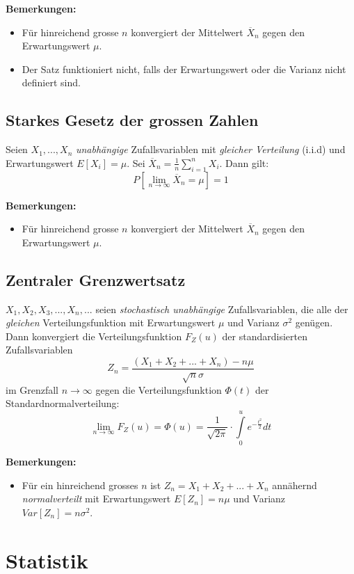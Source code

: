 \documentclass[10pt,a4paper,twocolumn]{article}
\begin{document}
\textbf{Bemerkungen:}
\begin{itemize}
\item Für hinreichend grosse $n$ konvergiert der Mittelwert $\overline{X}_n$ gegen den Erwartungswert $\mu$.
\item Der Satz funktioniert nicht, falls der Erwartungswert oder die Varianz nicht definiert sind.
\end{itemize}

\subsection{Starkes Gesetz der grossen Zahlen}
Seien $X_1,...,X_n$ \emph{unabhängige} Zufallsvariablen mit \emph{gleicher Verteilung} (i.i.d) und Erwartungswert $E[X_i]=\mu$. Sei $\overline{X}_n=\frac{1}{n}\sum\nolimits_{i=1}^{n}X_i$. Dann gilt:
\[
P\left[\lim_{n\to\infty}\overline{X}_n=\mu\right]=1
\]

\textbf{Bemerkungen:}
\begin{itemize}
\item Für hinreichend grosse $n$ konvergiert der Mittelwert $\overline{X}_n$ gegen den Erwartungswert $\mu$.
\end{itemize}

\subsection{Zentraler Grenzwertsatz}
$X_1,X_2,X_3,...,X_n,...$ seien \emph{stochastisch unabhängige} Zufallsvariablen, die alle der \emph{gleichen} Verteilungsfunktion mit Erwartungswert $\mu$ und Varianz $\sigma^2$ genügen. Dann konvergiert die Verteilungsfunktion $F_Z(u)$ der standardisierten Zufallsvariablen
\[
Z_n=\frac{(X_1+X_2+...+X_n)-n\mu}{\sqrt{n}\sigma}
\]
im Grenzfall $n\rightarrow\infty$ gegen die Verteilungsfunktion $\Phi(t)$ der Standardnormalverteilung:
\[
\lim_{n\to\infty}F_Z(u)=\Phi(u)=\frac{1}{\sqrt{2\pi}}\cdot\int\limits_{0}^{u}e^{-\frac{t^2}{2}}dt
\]

\textbf{Bemerkungen:}
\begin{itemize}
\item Für ein hinreichend grosses $n$ ist $Z_n=X_1+X_2+...+X_n$ annähernd \emph{normalverteilt} mit Erwartungswert $E[Z_n]=n\mu$ und Varianz $Var[Z_n]=n\sigma^2$.
\end{itemize}

\section{Statistik}
\end{document}
